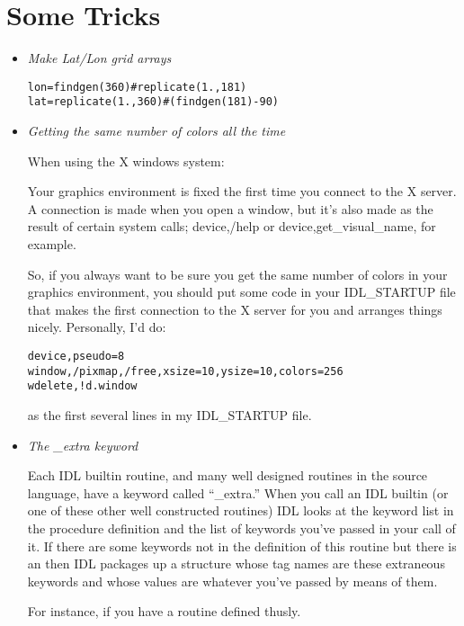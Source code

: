 \section{Some Tricks}\label{sec:qs-tricks}

\begin{itemize}

  \item \textit{Make Lat/Lon grid arrays}

\begin{alltt}
  lon=findgen(360)#replicate(1.,181)
  lat=replicate(1.,360)#(findgen(181)-90)
\end{alltt}

  \item \textit{Getting the same number of colors all the time}
  
   When using the X windows system:

   Your graphics environment is fixed the first time you connect to
  the X server. A connection is made when you open a window, but it's
  also made as the result of certain system calls; device,/help or
  device,get\_visual\_name, for example.

  So, if you always want to be sure you get the same number of colors
  in your graphics environment, you should put some code in your
  IDL\_STARTUP file that makes the first connection to the X server
  for you and arranges things nicely. Personally, I'd do:

\begin{alltt}
  device,pseudo=8
  window,/pixmap,/free,xsize=10,ysize=10,colors=256
  wdelete,!d.window
\end{alltt}

  as the first several lines in my IDL\_STARTUP file.
  

  \item \textit{The \_extra keyword}\label{sec:qs-extra-keyword}

   Each IDL builtin routine, and many well designed routines in the
  source language, have a keyword called ``\_extra.'' When you call an
  IDL builtin (or one of these other  well constructed routines) IDL
  looks at the keyword list in the procedure definition and the list
  of keywords you've passed in your call of it. If there are some
  keywords not in the definition of this routine but there is an
   then IDL packages up a structure whose tag names are
  these extraneous keywords and whose values are whatever you've
  passed by means of them.

  For instance, if you have a routine defined thusly.


\end{itemize}
